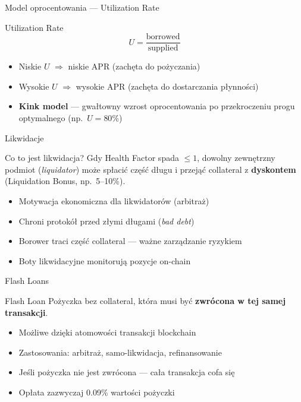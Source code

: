 \begin{frame}{Model oprocentowania --- Utilization Rate}
  \begin{block}{Utilization Rate}
    \[
      U = \frac{\text{borrowed}}{\text{supplied}}
    \]
  \end{block}
  \vspace{0.2cm}
  \begin{itemize}
    \item Niskie $U$ $\Rightarrow$ niskie APR (zachęta do pożyczania)
    \item Wysokie $U$ $\Rightarrow$ wysokie APR (zachęta do dostarczania płynności)
    \item \textbf{Kink model} --- gwałtowny wzrost oprocentowania po przekroczeniu progu optymalnego (np.\ $U = 80\%$)
  \end{itemize}
\end{frame}

\begin{frame}{Likwidacje}
  \begin{alertblock}{Co to jest likwidacja?}
    Gdy Health Factor spada $\leq 1$, dowolny zewnętrzny podmiot
    (\emph{liquidator}) może spłacić część długu i przejąć collateral
    z \textbf{dyskontem} (Liquidation Bonus, np.\ 5--10\%).
  \end{alertblock}
  \vspace{0.3cm}
  \begin{itemize}
    \item Motywacja ekonomiczna dla likwidatorów (arbitraż)
    \item Chroni protokół przed złymi długami (\emph{bad debt})
    \item Borower traci część collateral --- ważne zarządzanie ryzykiem
    \item Boty likwidacyjne monitorują pozycje on-chain
  \end{itemize}
\end{frame}

\begin{frame}{Flash Loans}
  \begin{block}{Flash Loan}
    Pożyczka bez collateral, która musi być \textbf{zwrócona w tej samej transakcji}.
  \end{block}
  \vspace{0.3cm}
  \begin{itemize}
    \item Możliwe dzięki atomowości transakcji blockchain
    \item Zastosowania: arbitraż, samo-likwidacja, refinansowanie
    \item Jeśli pożyczka nie jest zwrócona --- cała transakcja cofa się
    \item Opłata zazwyczaj 0.09\% wartości pożyczki
  \end{itemize}
\end{frame}

